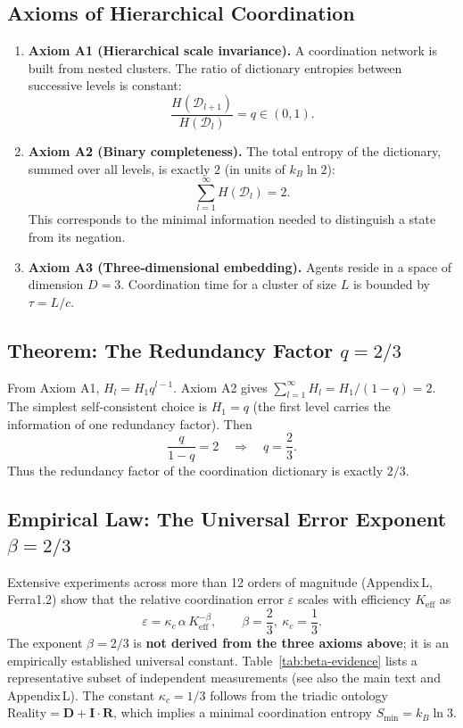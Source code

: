 \documentclass[11pt,a4paper]{article}
\begin{document}
\subsection{Axioms of Hierarchical Coordination}

\begin{enumerate}
	\item \textbf{Axiom A1 (Hierarchical scale invariance).} A coordination network is built from nested clusters. The ratio of dictionary entropies between successive levels is constant:
	\[
	\frac{H(\mathcal{D}_{l+1})}{H(\mathcal{D}_l)} = q \in (0,1).
	\]
	
	\item \textbf{Axiom A2 (Binary completeness).} The total entropy of the dictionary, summed over all levels, is exactly \(2\) (in units of \(k_B\ln 2\)):
	\[
	\sum_{l=1}^{\infty} H(\mathcal{D}_l) = 2.
	\]
	This corresponds to the minimal information needed to distinguish a state from its negation.
	
	\item \textbf{Axiom A3 (Three‑dimensional embedding).} Agents reside in a space of dimension \(D=3\). Coordination time for a cluster of size \(L\) is bounded by \(\tau = L/c\).
\end{enumerate}

\subsection{Theorem: The Redundancy Factor \(q = 2/3\)}

From Axiom A1, \(H_l = H_1 q^{l-1}\). Axiom A2 gives \(\sum_{l=1}^\infty H_l = H_1/(1-q) = 2\). The simplest self‑consistent choice is \(H_1 = q\) (the first level carries the information of one redundancy factor). Then
\[
\frac{q}{1-q} = 2 \quad\Longrightarrow\quad \boxed{q = \frac{2}{3}}.
\]
Thus the redundancy factor of the coordination dictionary is exactly \(2/3\).

\subsection{Empirical Law: The Universal Error Exponent \(\beta = 2/3\)}

Extensive experiments across more than 12 orders of magnitude (Appendix L, Ferra1.2) show that the relative coordination error \(\varepsilon\) scales with efficiency \(K_{\mathrm{eff}}\) as
\[
\varepsilon = \kappa_c \, \alpha \, K_{\mathrm{eff}}^{-\beta}, \qquad \boxed{\beta = \frac{2}{3}},\ \kappa_c = \frac{1}{3}.
\]
The exponent \(\beta = 2/3\) is \textbf{not derived from the three axioms above}; it is an empirically established universal constant. Table~\ref{tab:beta-evidence} lists a representative subset of independent measurements (see also the main text and Appendix L). The constant \(\kappa_c = 1/3\) follows from the triadic ontology \(\text{Reality} = \mathbf{D} + \mathbf{I}\!\cdot\!\mathbf{R}\), which implies a minimal coordination entropy \(S_{\min}=k_B\ln 3\).
\end{document}
